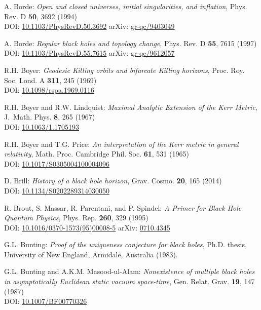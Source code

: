 \begin{thebibliography}{123}
A. Borde:
{\em Open and closed universes, initial singularities, and inflation},
Phys. Rev. D {\bf 50}, 3692 (1994)\\
DOI: \href{https://doi.org/10.1103/PhysRevD.50.3692}{10.1103/PhysRevD.50.3692}\hfill
arXiv: \href{https://arxiv.org/abs/gr-qc/9403049}{gr-qc/9403049}

A. Borde:
{\em Regular black holes and topology change},
Phys. Rev. D {\bf 55}, 7615 (1997)\\
DOI: \href{https://doi.org/10.1103/PhysRevD.55.7615}{10.1103/PhysRevD.55.7615}\hfill
arXiv: \href{https://arxiv.org/abs/gr-qc/9612057}{gr-qc/9612057}

R.H. Boyer: {\em Geodesic Killing orbits and bifurcate Killing horizons},
Proc. Roy. Soc. Lond. A {\bf 311}, 245 (1969)\\
DOI: \href{https://doi.org/10.1098/rspa.1969.0116}{10.1098/rspa.1969.0116}

R.H. Boyer and R.W. Lindquist: {\em Maximal Analytic Extension of the Kerr Metric},
J.~Math. Phys. {\bf 8}, 265 (1967)\\
DOI: \href{https://doi.org/10.1063/1.1705193}{10.1063/1.1705193}

R.H. Boyer and T.G. Price: {\em An interpretation of the Kerr metric in general relativity},
Math. Proc. Cambridge Phil. Soc. {\bf 61}, 531 (1965)\\
DOI: \href{https://doi.org/10.1017/S0305004100004096}{10.1017/S0305004100004096}

D. Brill: {\em History of a black hole horizon},
Grav. Cosmo. {\bf 20}, 165 (2014) \\
DOI: \href{https://doi.org/10.1134/S0202289314030050}{10.1134/S0202289314030050}

R. Brout, S. Massar, R. Parentani, and P. Spindel:
{\em A Primer for Black Hole Quantum Physics},
Phys. Rep. {\bf 260}, 329 (1995)\\
DOI: \href{https://doi.org/10.1016/0370-1573(95)00008-5}{10.1016/0370-1573(95)00008-5}\hfill
arXiv: \href{https://arxiv.org/abs/0710.4345}{0710.4345}

G.L. Bunting:
{\em Proof of the uniqueness conjecture for black holes},
Ph.D. thesis, University of New England, Armidale, Australia (1983).

G.L. Bunting and A.K.M. Masood-ul-Alam:
{\em Nonexistence of multiple black holes in asymptotically Euclidean static vacuum space-time},
Gen. Relat. Grav. {\bf 19}, 147 (1987)\\
DOI: \href{https://doi.org/10.1007/BF00770326}{10.1007/BF00770326}


\end{thebibliography}
